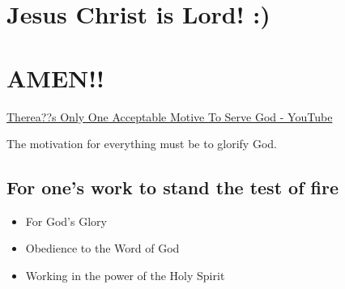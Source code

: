 \documentclass[11pt]{article}
\begin{document}
\section{Jesus Christ is Lord! :)}
\label{sec:org7c14c8b}

\section{AMEN!!}
\label{sec:orgfdbb956}
\href{https://www.youtube.com/watch?v=TEa3UWFgwnk}{Therea??s Only One Acceptable Motive To Serve God - YouTube}

The motivation for everything must be to glorify God.

\subsection{For one's work to stand the test of fire}
\label{sec:org10efeb3}
\begin{itemize}
\item For God's Glory
\item Obedience to the Word of God
\item Working in the power of the Holy Spirit
\end{itemize}
\end{document}
